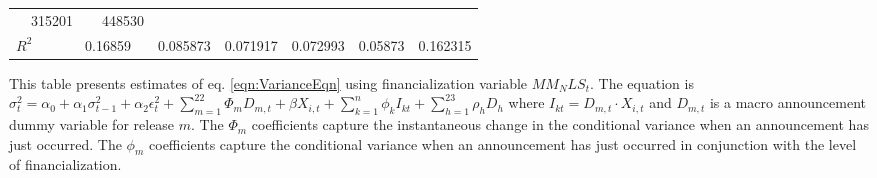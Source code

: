 \begin{sidewaystable}
{\begin{tabular}{@{}lllllllllllll@{}}
\multicolumn{2}{c}{ 315201 }                                                   & \multicolumn{2}{c}{ 448530 }                                                 \\ \textbf{$R^2$}             &\multicolumn{2}{c}{ 0.16859 }                                                 & \multicolumn{2}{c}{ 0.085873 }                                                 & \multicolumn{2}{c}{ 0.071917 }                                                 & \multicolumn{2}{c}{ 0.072993 }                                                 & \multicolumn{2}{c}{ 0.05873 }                                                   & \multicolumn{2}{c}{ 0.162315 }                                                 \\ \bottomrule 
\end{tabular}
}
\begin{tablenotes}\item 
        \singlespacing
        \footnotesize
        This table presents estimates of eq. \ref{eqn:VarianceEqn} using financialization variable $MM_NLS_t$. The equation is $\sigma_{t}^2=\alpha_0+\alpha_1 \sigma_{t-1}^2+\alpha_2 \epsilon_t^2 +\sum_{m=1}^{22} \Phi_m D_{m,t}+\beta X_{i,t}+\sum_{k=1}^n \phi_k I_{kt} + \sum_{h=1}^{23} \rho_h D_h$ where $I_{kt}=D_{m,t} \cdot X_{i,t}$ and $D_{m,t}$ is a macro announcement dummy variable for release $m$. The $\Phi_m$ coefficients capture the instantaneous change in the conditional variance when an announcement has just occurred. The $\phi_m$ coefficients capture the conditional variance when an announcement has just occurred in conjunction with the level of financialization.
\end{tablenotes}
\end{sidewaystable}

